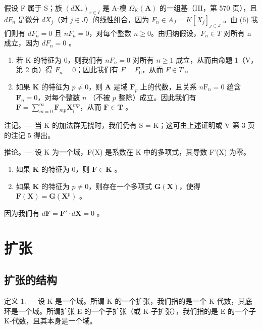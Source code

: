 假设 F 属于 S；族 \((d\mathbf{X}_{r})_{r\in I}\) 是 A-模 \(\Omega_{\mathrm{K}}(\mathbf{A})\) 的一组基（III，第 570 页），且 \(dF_{n}\) 是微分 \(dX_{j}\)（对 \(j\in J\)）的线性组合，因为 \(F_{n}\in A_{J}=K[X_{j}]_{j\in J}\) 。由 (6) 我们则有 \(dF_{n}=0\) 且 \(nF_{n}=0\)，对每个整数 \(n\geqslant0\)。由归纳假设，\(F_{n}\in T\) 对所有 n 成立，因为 \(dF_{n}=0\) 。

\begin{enumerate}
\def\labelenumi{\alph{enumi})}
\item
  若 K 的特征为 0，则我们有 \(nF_{n} = 0\) 对所有 \(n \geqslant 1\) 成立，从而由命题 1（V，第 2 页）得 \(F_{n} = 0\)；因此我们有 \(F = F_{0}\)，从而 \(F \in T\) 。
\item
  如果 \(\mathbf{K}\) 的特征为 \(p \neq 0\)，则 \(\mathbf{A}\) 是域 \(\mathbf{F}_p\) 上的代数，且关系 \(n\mathrm{F}_n = 0\) 蕴含 \(\mathbf{F}_n = 0\)，对每个整数 \(n\) （不被 \(p\) 整除）成立。因此我们有 \(\mathbf{F} = \sum_{m=0}^{\infty} \mathbf{F}_{mp} \mathbf{X}_i^{mp}\)，从而 \(\mathbf{F} \in \mathbf{T}\) 。
\end{enumerate}

注记。--- 当 K 的加法群无挠时，我们仍有 S = K；这可由上述证明或 V 第 3 页的注记 5 得出。

推论。--- 设 K 为一个域，F(X) 是系数在 K 中的多项式，其导数 F'(X) 为零。

\begin{enumerate}
\def\labelenumi{\alph{enumi})}
\item
  如果 \(\mathbf{K}\) 的特征为 0，则 \(\mathbf{F} \in \mathbf{K}\) 。
\item
  如果 \(\mathbf{K}\) 的特征为 \(p \neq 0\)，则存在一个多项式 \(\mathbf{G}(\mathbf{X})\)，使得 \(\mathbf{F}(\mathbf{X}) = \mathbf{G}(\mathbf{X}^p)\) 。
\end{enumerate}

因为我们有 \(d\mathbf{F} = \mathbf{F}' \cdot d\mathbf{X} = 0\) 。

\section{扩张}

\subsection{扩张的结构}

定义 1. --- 设 K 是一个域。所谓 K 的一个扩张，我们指的是一个 K-代数，其底环是一个域。所谓扩张 E 的一个子扩张（或 K-子扩张），我们指的是 E 的一个子 K-代数，且其本身是一个域。

